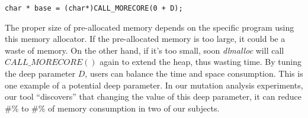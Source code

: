 \begin{lstlisting}
char * base = (char*)CALL_MORECORE(0 + D);
\end{lstlisting}

The proper size of pre-allocated memory depends on the specific program using this memory allocator. If the pre-allocated memory is too large, it could be a waste of memory. On the other hand, if it's too small, soon \emph{dlmalloc} will call $CALL\_MORECORE()$ again to extend the heap, thus wasting time. By tuning the deep parameter $D$, users can balance the time and space consumption. This is one example of a potential deep parameter. In our mutation analysis experiments, our tool ``discovers'' that changing the value of this deep parameter, it can reduce \#\% to \#\% of memory consumption in two of our subjects.

